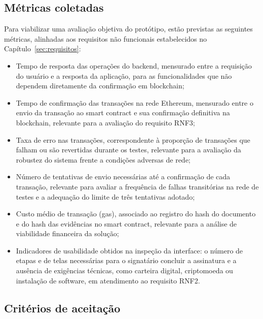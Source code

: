 \documentclass[
    12pt,
    a4paper,
    oneside,
    chapter=TITLE,
    section=TITLE,
    subsection=TITLE,
    subsubsection=TITLE,
    sumario=tradicional,
    english,
    brazil
]{abntex2}
\begin{document}
\subsection{Métricas coletadas}
\label{sec:metricas}

Para viabilizar uma avaliação objetiva do protótipo, estão previstas as seguintes métricas, alinhadas aos requisitos não funcionais estabelecidos no Capítulo~\ref{sec:requisitos}:
\begin{itemize}
\item Tempo de resposta das operações do backend, mensurado entre a requisição do usuário e a resposta da aplicação, para as funcionalidades que não dependem diretamente da confirmação em blockchain;

\item Tempo de confirmação das transações na rede Ethereum, mensurado entre o envio da transação ao smart contract e sua confirmação definitiva na blockchain, relevante para a avaliação do requisito RNF3;

\item Taxa de erro nas transações, correspondente à proporção de transações que falham ou são revertidas durante os testes, relevante para a avaliação da robustez do sistema frente a condições adversas de rede;

\item Número de tentativas de envio necessárias até a confirmação de cada transação, relevante para avaliar a frequência de falhas transitórias na rede de testes e a adequação do limite de três tentativas adotado;

\item Custo médio de transação (gas), associado ao registro do hash do documento e do hash das evidências no smart contract, relevante para a análise de viabilidade financeira da solução;

\item Indicadores de usabilidade obtidos na inspeção da interface: o número de etapas e de telas necessárias para o signatário concluir a assinatura e a ausência de exigências técnicas, como carteira digital, criptomoeda ou instalação de software, em atendimento ao requisito RNF2.
\end{itemize}
\subsection{Critérios de aceitação}
\end{document}
